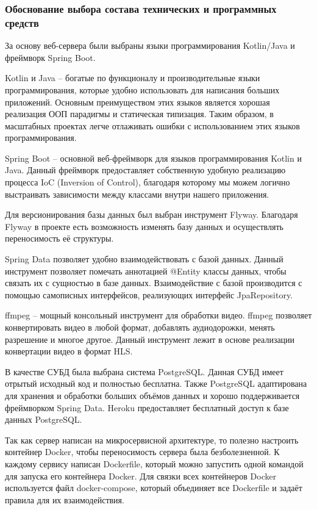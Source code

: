 \documentclass{../includes/TechDoc}
\begin{document}
    \subsubsection{Обоснование выбора состава технических и программных средств}

    За основу веб-сервера были выбраны языки программирования Kotlin/Java и фреймворк Spring Boot.

    Kotlin и Java -- богатые по функционалу и производительные языки программирования, которые удобно использовать для написания больших приложений.
    Основным преимуществом этих языков является хорошая реализация ООП парадигмы и статическая типизация.
    Таким образом, в масштабных проектах легче отлаживать ошибки с использованием этих языков программирования.

    Spring Boot -- основной веб-фреймворк для языков программирования Kotlin и Java.
    Данный фреймворк предоставляет собственную удобную реализацию процесса IoC (Inversion of Control), благодаря которому мы можем логично выстраивать зависимости между классами внутри нашего приложения.

    Для версионирования базы данных был выбран инструмент Flyway.
    Благодаря Flyway в проекте есть возможность изменять базу данных и осуществлять переносимость её структуры.

    Spring Data позволяет удобно взаимодействовать с базой данных.
    Данный инструмент позволяет помечать аннотацией @Entity классы данных, чтобы связать их с сущностью в базе данных.
    Взаимодействие с базой производится с помощью самописных интерфейсов, реализующих интерфейс JpaRepository.

    ffmpeg -- мощный консольный инструмент для обработки видео.
    ffmpeg позволяет конвертировать видео в любой формат, добавлять аудиодорожки, менять разрешение и многое другое.
    Данный инструмент лежит в основе реализации конвертации видео в формат HLS.

    В качестве СУБД была выбрана система PostgreSQL\@.
    Данная СУБД имеет отрытый исходный код и полностью бесплатна.
    Также PostgreSQL адаптирована для хранения и обработки больших объёмов данных и хорошо поддерживается фреймворком Spring Data.
    Heroku предоставляет бесплатный доступ к базе данных PostgreSQL.

    Так как сервер написан на микросервисной архитектуре, то полезно настроить контейнер Docker, чтобы переносимость сервера была безболезненной.
    К каждому сервису написан Dockerfile, который можно запустить одной командой для запуска его контейнера Docker.
    Для связки всех контейнеров Docker используется файл docker-compose, который объединяет все Dockerfile и задаёт правила для их взаимодействия.
\end{document}
